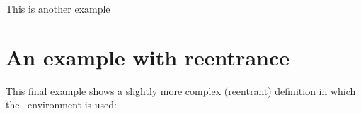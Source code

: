 \documentclass[a4paper,final,11pt]{article}
\begin{document}
This is another example


\section{An example with reentrance}
This final example shows a slightly more complex (reentrant)
definition in 
which the ~environment is used:
\end{document}
